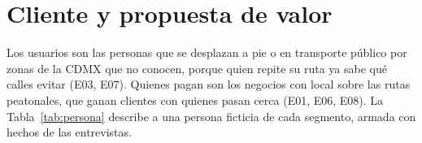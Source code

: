 \documentclass[11pt]{article}
\begin{document}
\section{Cliente y propuesta de valor}
\label{sec:cliente}

Los usuarios son las personas que se desplazan a pie o en transporte público por zonas de la CDMX
que no conocen, porque quien repite su ruta ya sabe qué calles evitar (E03, E07). Quienes pagan son
los negocios con local sobre las rutas peatonales, que ganan clientes con quienes pasan cerca (E01,
E06, E08). La Tabla~\ref{tab:persona} describe a una persona ficticia de cada segmento, armada con
hechos de las entrevistas.
\end{document}
